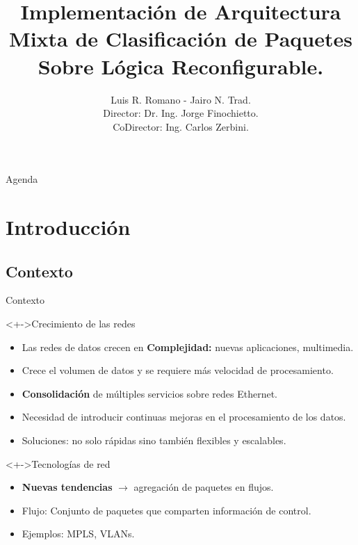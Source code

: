 \documentclass[xcolor=dvipsnames]{beamer}
\title[] {Implementación de Arquitectura Mixta de Clasificación de Paquetes Sobre Lógica Reconfigurable.}
\author[] 
{
	Luis R. Romano - Jairo N. Trad. \\
	\scriptsize Director: Dr. Ing. Jorge Finochietto. \\
  	\scriptsize CoDirector: Ing. Carlos Zerbini. \\ 
}
\institute[Universidades] %
{   
  \scriptsize Laboratorio de Comunicaciones Digitales \\
  \scriptsize Universidad Nacional de Córdoba, Facultad Ciencias Exactas, Físicas y Naturales \\ 
}
\begin{document}
\begin{frame}
  \titlepage
\end{frame}

\begin{frame}{Agenda}
  \tiny 
  \tableofcontents
\end{frame}

\scriptsize

\section{Introducción}

\subsection{Contexto}

\begin{frame}{Contexto}
  \scriptsize
  
  \begin{block}<+->{Crecimiento de las redes}

    \begin{itemize}
      \item Las redes de datos crecen en {\bf Complejidad:} nuevas aplicaciones, multimedia.
      \item Crece el volumen de datos y se requiere más velocidad de procesamiento.
      \item {\bf Consolidación} de múltiples servicios sobre redes Ethernet.     
      \item Necesidad de introducir continuas mejoras en el procesamiento de los datos.
      \item Soluciones: no solo rápidas sino también flexibles y escalables.
    \end{itemize}
    
  \end{block}
      \begin{block}<+->{Tecnologías de red}  
    \begin{itemize}
      \scriptsize
      \item {\bf Nuevas tendencias} $\rightarrow$ agregación de paquetes en flujos.
      \item Flujo: Conjunto de paquetes que comparten información de control.
      \item Ejemplos: MPLS, VLANs.
    \end{itemize}
  \end{block}

\end{frame}
\end{document}
